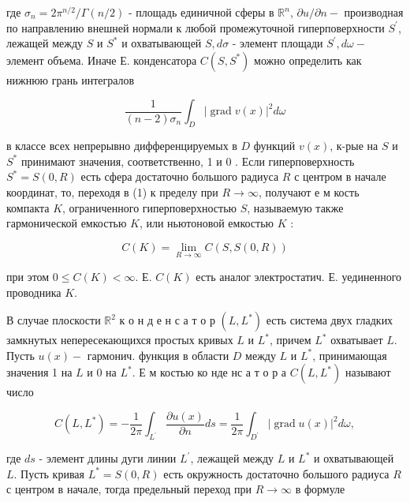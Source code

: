 \documentclass[10pt]{article}
\begin{document}
где $\sigma_{n}=2 \pi^{n / 2} / \Gamma(n / 2)$ - площадь единичной сферы в $\mathbb{R}^{n}$, $\partial u / \partial n-$ производная по направлению внешней нормали к любой промежуточной гиперповерхности $S^{\prime}$, лежащей между $S$ и $S^{*}$ и охватывающей $S, d \sigma$ - элемент площади $S^{\prime}, d \omega-$ элемент объема. Иначе Е. конденсатора $C\left(S, S^{*}\right)$ можно определить как нижнюю грань интегралов



\[

\frac{1}{(n-2) \sigma_{n}} \int_{D}|\operatorname{grad} v(x)|^{2} d \omega

\]



в классе всех непрерывно дифференцируемых в $D$ функций $v(x)$, к-рые на $S$ и $S^{*}$ принимают значения, соответственно, 1 и 0 . Если гиперповерхность $S^{*}=S(0, R)$ есть сфера достаточно большого радиуса $R$ с центром в начале координат, то, переходя в (1) к пределу при $R \rightarrow \infty$, получают е м кость компакта $K$, ограниченного гиперповерхностью $S$, называемую также гармонической емкостью $K$, или ньютоновой емкостью $K$ :



\[

C(K)=\lim _{R \rightarrow \infty} C(S, S(0, R))

\]



при этом $0 \leqslant C(K)<\infty$. Е. $C(K)$ есть аналог электростатич. Е. уединенного проводника $K$.



В случае плоскости $\mathbb{R}^{2}$ к о н д е н с а т о р $\left(L, L^{*}\right)$ есть система двух гладких замкнутых непересекающихся простых кривых $L$ и $L^{*}$, причем $L^{*}$ охватывает $L$. Пусть $u(x)-$ гармонич. функция в области $D$ между $L$ и $L^{*}$, принимающая значения 1 на $L$ и 0 на $L^{*}$. Е м костью ко нде нс а т о р а $C\left(L, L^{*}\right)$ называют число



\[

C\left(L, L^{*}\right)=-\frac{1}{2 \pi} \int_{L^{\prime}} \frac{\partial u(x)}{\partial n} d s=\frac{1}{2 \pi} \int_{D^{\prime}}|\operatorname{grad} u(x)|^{2} d \omega,

\]



где $d s$ - элемент длины дуги линии $L^{\prime}$, лежащей между $L$ и $L^{*}$ и охватывающей $L$. Пусть кривая $L^{*}=S(0, R)$ есть окружность достаточно большого радиуса $R$ с центром в начале, тогда предельный переход при $R \rightarrow \infty$ в формуле
\end{document}
